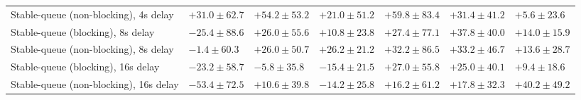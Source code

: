 \begin{table}[H]
{\begin{tabular}{l w{c}{5.0em} w{c}{5.0em} w{c}{5.0em} w{c}{5.0em} w{c}{5.0em} w{c}{5.0em}}
Stable-queue (non-blocking), 4s delay & $+31.0\pm62.7$ & $+54.2\pm53.2$ & $+21.0\pm51.2$ & $+59.8\pm83.4$ & $+31.4\pm41.2$ & $+5.6\pm23.6$ \\
Stable-queue (blocking), 8s delay & $-25.4\pm88.6$ & $+26.0\pm55.6$ & $+10.8\pm23.8$ & $+27.4\pm77.1$ & $+37.8\pm40.0$ & $+14.0\pm15.9$ \\
Stable-queue (non-blocking), 8s delay & $-1.4\pm60.3$ & $+26.0\pm50.7$ & $+26.2\pm21.2$ & $+32.2\pm86.5$ & $+33.2\pm46.7$ & $+13.6\pm28.7$ \\
Stable-queue (blocking), 16s delay & $-23.2\pm58.7$ & $-5.8\pm35.8$ & $-15.4\pm21.5$ & $+27.0\pm55.8$ & $+25.0\pm40.1$ & $+9.4\pm18.6$ \\
Stable-queue (non-blocking), 16s delay & $-53.4\pm72.5$ & $+10.6\pm39.8$ & $-14.2\pm25.8$ & $+16.2\pm61.2$ & $+17.8\pm32.3$ & $+40.2\pm49.2$ \\
\bottomrule
\end{tabular}%
}
\end{table}
